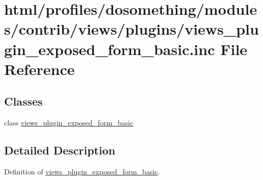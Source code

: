 \hypertarget{views__plugin__exposed__form__basic_8inc}{
\section{html/profiles/dosomething/modules/contrib/views/plugins/views\_\-plugin\_\-exposed\_\-form\_\-basic.inc File Reference}
\label{views__plugin__exposed__form__basic_8inc}
}
\subsection*{Classes}
\begin{DoxyCompactItemize}
\item 
class \hyperlink{classviews__plugin__exposed__form__basic}{views\_\-plugin\_\-exposed\_\-form\_\-basic}
\end{DoxyCompactItemize}


\subsection{Detailed Description}
Definition of \hyperlink{classviews__plugin__exposed__form__basic}{views\_\-plugin\_\-exposed\_\-form\_\-basic}. 